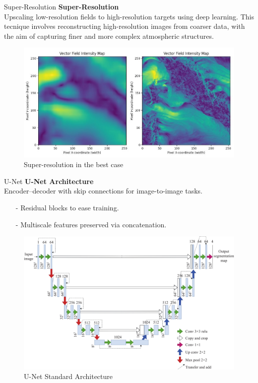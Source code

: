 \documentclass[footline=authortitle]{beamer}
\begin{document}
\begin{frame}{Super-Resolution}
\textbf{Super-Resolution}\\\justifying
Upscaling low-resolution fields to high-resolution targets using deep learning. This tecnique involves reconstructing high-resolution images from coarser data, with the aim of capturing finer and more complex atmospheric structures.
\begin{figure}
    \centering
    \includegraphics[width=0.8\linewidth]{images/img_superris.jpeg}
    \caption{Super-resolution in the best case}
    \label{fig:enter-label}
\end{figure}
\end{frame}

\begin{frame}{U-Net}
    \textbf{U-Net Architecture}\\Encoder–decoder with skip connections for image-to-image tasks.
      \begin{itemize}
        \item[-] Residual blocks to ease training.
        \item[-] Multiscale features preserved via concatenation.
      \end{itemize}
      \begin{figure}
          \centering
          \includegraphics[width=0.6\linewidth]{images/unet.jpg}
          \caption{U-Net Standard Architecture}
          \label{fig:enter-label}
      \end{figure}
\end{frame}
\end{document}
